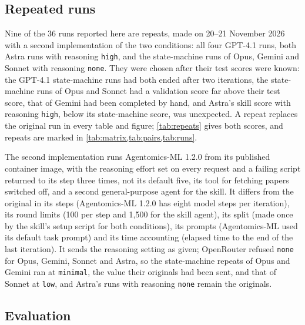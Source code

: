 \subsection{Repeated runs}\label{sec:repeats}

Nine of the 36 runs reported here are repeats, made on 20--21 November 2026 with a second implementation of the two
conditions: all four GPT-4.1 runs, both Astra runs with reasoning \texttt{high}, and the state-machine runs of Opus,
Gemini and Sonnet with reasoning \texttt{none}. They were chosen after their test scores were known: the GPT-4.1
state-machine runs had both ended after two iterations, the state-machine runs of Opus and Sonnet had a validation
score far above their test score, that of Gemini had been completed by hand, and Astra's skill score with reasoning
\texttt{high}, below its state-machine score, was unexpected. A repeat replaces the original run in every table and
figure; \cref{tab:repeats} gives both scores, and repeats are marked in \cref{tab:matrix,tab:pairs,tab:runs}.

\begin{table}[tbp]\centering\small
\caption{The nine repeated configurations: test AU-PRC of the original run and of the repeat that replaces it, with the
number of iterations that produced a scored model (It.). $\Delta$: repeat minus original.}
\label{tab:repeats}
\RepeatTable
\end{table}

The second implementation runs Agentomics-ML 1.2.0 from its published container image, with the reasoning effort set
on every request and a failing script returned to its step three times, not its default five, its tool for fetching papers switched off, and a second
general-purpose agent for the skill. It differs from the original in its steps (Agentomics-ML 1.2.0 has eight model
steps per iteration), its round limits (100 per step and 1,500 for the skill agent), its split (made once by the
skill's setup script for both conditions), its prompts (Agentomics-ML used its default task prompt) and its time
accounting (elapsed time to the end of the last iteration). It sends the reasoning setting as given; OpenRouter refused
\texttt{none} for Opus, Gemini, Sonnet and Astra, so the state-machine repeats of Opus and Gemini ran at
\texttt{minimal}, the value their originals had been sent, and that of Sonnet at \texttt{low}, and Astra's runs with
reasoning \texttt{none} remain the originals.

\subsection{Evaluation}\label{sec:evaluation}

